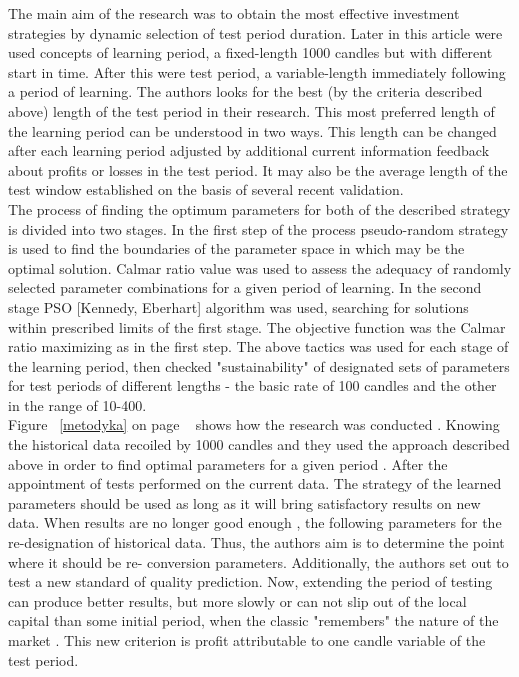 \documentclass{tewiart}
\begin{document}
The main aim of the research was to obtain the most effective investment strategies by dynamic selection of test period duration. Later in this article were used concepts of learning period, a fixed-length 1000 candles but with different start in time. After this were test period, a variable-length immediately following a period of learning. The authors looks for the best (by the criteria described above) length of the test period in their research. This most preferred length of the learning period can be understood in two ways. This length can be changed after each learning period adjusted by additional current information feedback about profits or losses in the test period. It may also be the average length of the test window established on the basis of several recent validation.\\

The process of finding the optimum parameters for both of the described strategy is divided into two stages. In the first step of the process pseudo-random strategy is used to find the boundaries of the parameter space in which may be the optimal solution. Calmar ratio value was used to assess the adequacy of randomly selected parameter combinations for a given period of learning. In the second stage PSO [Kennedy, Eberhart]  algorithm was used, searching for solutions within prescribed limits of the first stage. The objective function was the Calmar ratio maximizing as in the first step. The above tactics was used for each stage of the learning period, then checked "sustainability" of designated sets of parameters for test periods of different lengths - the basic rate of 100 candles and the other in the range of 10-400.\\

Figure ~\ref{metodyka} on page ~\pageref{metodyka} shows how the research was conducted . Knowing the historical data recoiled by 1000 candles and they used the approach described above in order to find optimal parameters for a given period . After the appointment of tests performed on the current data. The strategy of the learned parameters should be used as long as it will bring satisfactory results on new data. When results are no longer good enough , the following parameters for the re-designation of historical data. Thus, the authors aim is to determine the point where it should be re- conversion parameters. Additionally, the authors set out to test a new standard of quality prediction. Now, extending the period of testing can produce better results, but more slowly or can not slip out of the local capital than some initial period, when the classic "remembers" the nature of the market . This new criterion is profit attributable to one candle variable of the test period.\\
\end{document}
